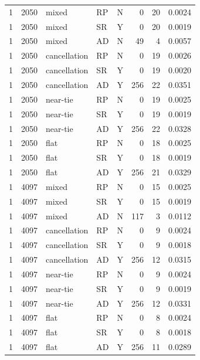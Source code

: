 \begin{longtable}{rrllcrrr}
1 & 2050 & mixed & RP & N & 0 & 20 & 0.0024 \\
1 & 2050 & mixed & SR & Y & 0 & 20 & 0.0019 \\
1 & 2050 & mixed & AD & N & 49 & 4 & 0.0057 \\
1 & 2050 & cancellation & RP & N & 0 & 19 & 0.0026 \\
1 & 2050 & cancellation & SR & Y & 0 & 19 & 0.0020 \\
1 & 2050 & cancellation & AD & Y & 256 & 22 & 0.0351 \\
1 & 2050 & near-tie & RP & N & 0 & 19 & 0.0025 \\
1 & 2050 & near-tie & SR & Y & 0 & 19 & 0.0019 \\
1 & 2050 & near-tie & AD & Y & 256 & 22 & 0.0328 \\
1 & 2050 & flat & RP & N & 0 & 18 & 0.0025 \\
1 & 2050 & flat & SR & Y & 0 & 18 & 0.0019 \\
1 & 2050 & flat & AD & Y & 256 & 21 & 0.0329 \\
1 & 4097 & mixed & RP & N & 0 & 15 & 0.0025 \\
1 & 4097 & mixed & SR & Y & 0 & 15 & 0.0019 \\
1 & 4097 & mixed & AD & N & 117 & 3 & 0.0112 \\
1 & 4097 & cancellation & RP & N & 0 & 9 & 0.0024 \\
1 & 4097 & cancellation & SR & Y & 0 & 9 & 0.0018 \\
1 & 4097 & cancellation & AD & Y & 256 & 12 & 0.0315 \\
1 & 4097 & near-tie & RP & N & 0 & 9 & 0.0024 \\
1 & 4097 & near-tie & SR & Y & 0 & 9 & 0.0019 \\
1 & 4097 & near-tie & AD & Y & 256 & 12 & 0.0331 \\
1 & 4097 & flat & RP & N & 0 & 8 & 0.0024 \\
1 & 4097 & flat & SR & Y & 0 & 8 & 0.0018 \\
1 & 4097 & flat & AD & Y & 256 & 11 & 0.0289 \\
\hline
\end{longtable}
\endgroup
{}
\par\medskip
